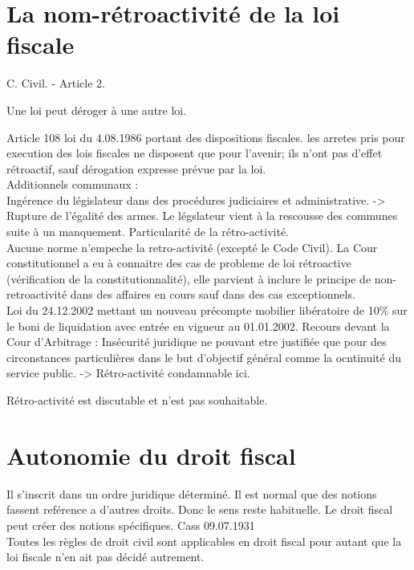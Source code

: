 \documentclass{book}
\begin{document}
\section{La nom-rétroactivité de la loi fiscale}

C. Civil. - Article 2. 

Une loi peut déroger à une autre loi.

Article 108 loi du 4.08.1986 portant des dispositions fiscales. les arretes pris pour execution des lois fiscales ne disposent que pour l'avenir; ils n'ont pas d'effet rétroactif, sauf dérogation expresse prévue par la loi.\\

Additionnels communaux :\\

Ingérence du législateur dans des procédures judiciaires et administrative. -> Rupture de l'égalité des armes. Le légslateur vient à la rescousse des communes suite à un manquement. Particularité de la rétro-activité.\\

Aucune norme n'empeche la retro-activité (excepté le Code Civil). La Cour constitutionnel a eu à connaitre des cas de probleme de loi rétroactive (vérification de la constitutionnalité), elle parvient à inclure le principe de non-retroactivité dans des affaires en cours sauf dans des cas exceptionnels.\\

Loi du 24.12.2002 mettant un nouveau précompte mobilier libératoire de 10\% sur le boni de liquidation avec entrée en vigueur au 01.01.2002. Recours devant la Cour d'Arbitrage : Insécurité juridique ne pouvant etre justifiée que pour des circonstances particulières dans le but d'objectif général comme la ocntinuité du service public. -> Rétro-activité condamnable ici.

Rétro-activité est discutable et n'est pas souhaitable.

\section{Autonomie du droit fiscal}

Il s'inscrit dans un ordre juridique déterminé. Il est normal que des notions fassent reférence a d'autres droits. Donc le sens reste habituelle. Le droit fiscal peut créer des notions spécifiques. Cass 09.07.1931\\

Toutes les règles de droit civil sont applicables en droit fiscal pour autant que la loi fiscale n'en ait pas décidé autrement.\\
\end{document}
